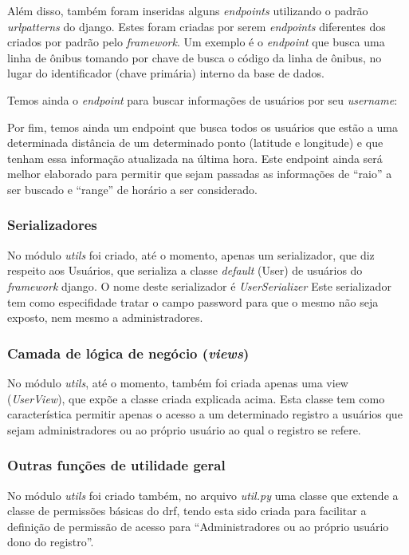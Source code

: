 Além disso, também foram inseridas alguns \textit{endpoints} utilizando o padrão \textit{urlpatterns} do \gls{django}. Estes foram criadas por serem \textit{endpoints} diferentes dos criados por padrão pelo \textit{framework}. Um exemplo é o \textit{endpoint} que busca uma linha de ônibus tomando por chave de busca o código da linha de ônibus, no lugar do identificador (chave primária) interno da base de dados.

Temos ainda o \textit{endpoint} para buscar informações de usuários por seu \textit{username}:

Por fim, temos ainda um endpoint que busca todos os usuários que estão a uma determinada distância de um determinado ponto (latitude e longitude) e que tenham essa informação atualizada na última hora. Este endpoint ainda será melhor elaborado para permitir que sejam passadas as informações de ``raio'' a ser buscado e ``range'' de horário a ser considerado.


\subsubsection{Serializadores}
No módulo \textit{utils} foi criado, até o momento, apenas um serializador, que diz respeito aos Usuários, que serializa a classe \textit{default} (User) de usuários do \textit{framework} \gls{django}. O nome deste serializador é \textit{UserSerializer} %
Este serializador tem como especifidade tratar o campo password para que o mesmo não seja exposto, nem mesmo a administradores.

\subsubsection{Camada de lógica de negócio (\textit{views})}
No módulo \textit{utils}, até o momento, também foi criada apenas uma view (\textit{UserView}), que expõe a classe criada explicada acima. Esta classe tem como característica permitir apenas o acesso a um determinado registro a usuários que sejam administradores ou ao próprio usuário ao qual o registro se refere.

\subsubsection{Outras funções de utilidade geral}
No módulo \textit{utils} foi criado também, no arquivo \textit{util.py} uma classe que extende a classe de permissões básicas do \gls{drf}, tendo esta sido criada para facilitar a definição de permissão de acesso para ``Administradores ou ao próprio usuário dono do registro''.


